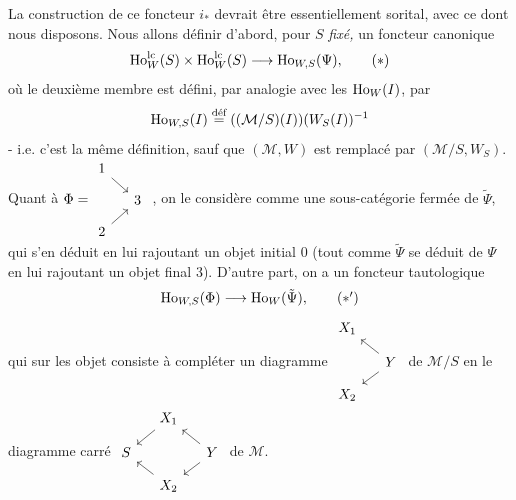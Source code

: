 La construction de ce foncteur $i_*$ devrait être essentiellement sorital, avec ce dont nous disposons. Nous allons définir d'abord, pour $S$ \textit{fixé,} un foncteur canonique
\[
\Ho^{\lc}_W(S) \times \Ho^{\lc}_W(S) \longrightarrow \Ho_{W,S}(\Psi), \tag*{$(*)$}
\]
où le deuxième membre est défini, par analogie avec les $\mathrm{Ho}_W(I)$, par
\[
\mathrm{Ho}_{W,S}(I) \overset{\text{déf}}{=} ((\mathcal{M}/S)(I))(W_S(I))^{-1}
\]
- i.e. c'est la même définition, sauf que $(\mathcal{M}, W)$ est remplacé par $(\mathcal{M}/S, W_S)$. Quant à $\Phi = \vcenter{\hbox{\begin{tikzcd}[ampersand replacement=\&, row sep=small, column sep=small]
1 \arrow[dr] \& \\
 \& 3 \\
2 \arrow[ur] \&
\end{tikzcd}}}$ , on le considère comme une sous-catégorie fermée de $\tilde{\Psi}$, qui s'en déduit en lui rajoutant un objet initial 0 (tout comme $\tilde{\Psi}$ se déduit de $\Psi$ en lui rajoutant un objet final 3). D'autre part, on a un foncteur tautologique
\[
\Ho_{W,S}(\Phi) \longrightarrow \Ho_W(\tilde{\Psi}), \tag*{$(*')$}
\]
qui sur les objet consiste à compléter un diagramme $\vcenter{\hbox{\begin{tikzcd}[ampersand replacement=\&, row sep=small, column sep=small] %
X_1 \& \\
 \& Y \arrow[ul] \arrow[dl] \\
X_2 \&
\end{tikzcd}}}$ de $\mathcal{M}/S$ en le diagramme carré $\vcenter{\hbox{\begin{tikzcd}[ampersand replacement=\&, row sep=small, column sep=small]
 \& X_1 \arrow[dl] \& \\
S \& \& Y \arrow[ul] \arrow[dl] \\
 \& X_2 \arrow[ul] \&
\end{tikzcd}}}$ de $\mathcal{M}$.

